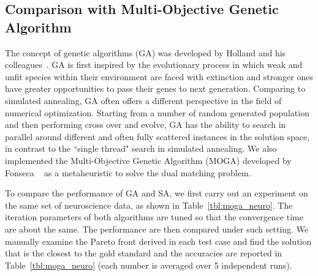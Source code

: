 \subsection{Comparison with Multi-Objective Genetic Algorithm}
The concept of genetic algorithms (GA) was developed by Holland and his colleagues~\cite{Holland1992}. GA is first inspired by the evolutionary process in which weak and unfit species within their environment are faced with extinction and stronger ones have greater opportunities to pass their genes to next generation. Comparing to simulated annealing, GA often offers a different perspective in the field of numerical optimization. Starting from a number of random generated population and then performing cross over and evolve, GA has the ability to search in parallel around different and often fully scattered instances in the solution space, in contrast to the ``single thread" search in simulated annealing. We also implemented the Multi-Objective Genetic Algorithm (MOGA) developed by Fonseca \etal~\cite{Fonseca1993} as a metaheuristic to solve the dual matching problem.


To compare the performance of GA and SA, we first carry out an experiment on the same set of neuroscience data, as shown in Table~\ref{tbl:moga_neuro}. The iteration parameters of both algorithms are tuned so that the convergence time are about the same. The performance are then compared under such setting. We manually examine the Pareto front derived in each test case and find the solution that is the closest to the gold standard and the accuracies are reported in Table~\ref{tbl:moga_neuro} (each number is averaged over 5 independent runs).

